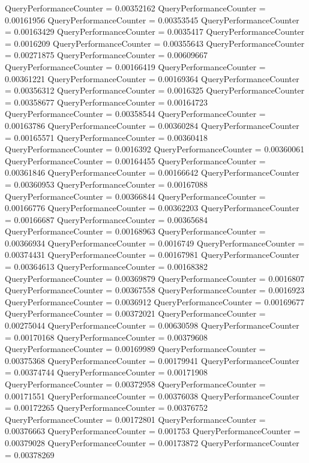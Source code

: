 \documentclass[9pt]{article}
\theoremstyle{plain}
\theoremstyle{definition}
\theoremstyle{remark}
\numberwithin{equation}{section}
\begin{document}
QueryPerformanceCounter  =  0.00352162
QueryPerformanceCounter  =  0.00161956
QueryPerformanceCounter  =  0.00353545
QueryPerformanceCounter  =  0.00163429
QueryPerformanceCounter  =  0.0035417
QueryPerformanceCounter  =  0.0016209
QueryPerformanceCounter  =  0.00355643
QueryPerformanceCounter  =  0.00271875
QueryPerformanceCounter  =  0.00609667
QueryPerformanceCounter  =  0.00166419
QueryPerformanceCounter  =  0.00361221
QueryPerformanceCounter  =  0.00169364
QueryPerformanceCounter  =  0.00356312
QueryPerformanceCounter  =  0.0016325
QueryPerformanceCounter  =  0.00358677
QueryPerformanceCounter  =  0.00164723
QueryPerformanceCounter  =  0.00358544
QueryPerformanceCounter  =  0.00163786
QueryPerformanceCounter  =  0.00360284
QueryPerformanceCounter  =  0.00165571
QueryPerformanceCounter  =  0.00360418
QueryPerformanceCounter  =  0.0016392
QueryPerformanceCounter  =  0.00360061
QueryPerformanceCounter  =  0.00164455
QueryPerformanceCounter  =  0.00361846
QueryPerformanceCounter  =  0.00166642
QueryPerformanceCounter  =  0.00360953
QueryPerformanceCounter  =  0.00167088
QueryPerformanceCounter  =  0.00366844
QueryPerformanceCounter  =  0.00166776
QueryPerformanceCounter  =  0.00362203
QueryPerformanceCounter  =  0.00166687
QueryPerformanceCounter  =  0.00365684
QueryPerformanceCounter  =  0.00168963
QueryPerformanceCounter  =  0.00366934
QueryPerformanceCounter  =  0.0016749
QueryPerformanceCounter  =  0.00374431
QueryPerformanceCounter  =  0.00167981
QueryPerformanceCounter  =  0.00364613
QueryPerformanceCounter  =  0.00168382
QueryPerformanceCounter  =  0.00369879
QueryPerformanceCounter  =  0.0016807
QueryPerformanceCounter  =  0.00367558
QueryPerformanceCounter  =  0.0016923
QueryPerformanceCounter  =  0.0036912
QueryPerformanceCounter  =  0.00169677
QueryPerformanceCounter  =  0.00372021
QueryPerformanceCounter  =  0.00275044
QueryPerformanceCounter  =  0.00630598
QueryPerformanceCounter  =  0.00170168
QueryPerformanceCounter  =  0.00379608
QueryPerformanceCounter  =  0.00169989
QueryPerformanceCounter  =  0.00375368
QueryPerformanceCounter  =  0.00179941
QueryPerformanceCounter  =  0.00374744
QueryPerformanceCounter  =  0.00171908
QueryPerformanceCounter  =  0.00372958
QueryPerformanceCounter  =  0.00171551
QueryPerformanceCounter  =  0.00376038
QueryPerformanceCounter  =  0.00172265
QueryPerformanceCounter  =  0.00376752
QueryPerformanceCounter  =  0.00172801
QueryPerformanceCounter  =  0.00376663
QueryPerformanceCounter  =  0.001753
QueryPerformanceCounter  =  0.00379028
QueryPerformanceCounter  =  0.00173872
QueryPerformanceCounter  =  0.00378269
\end{document}
